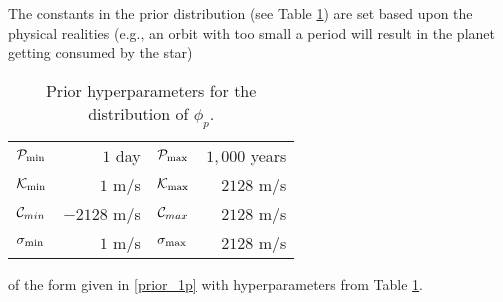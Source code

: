 The constants in the prior distribution (see Table \ref{tab:hyper}) are set based upon the physical realities
(e.g., an orbit with too small a period will result in the planet
getting consumed by the star) \citep{bullard2009edc}
\begin{table}[h]
  \begin{center}
  \begin{tabular}{|lr|lr|} \hline \hline
$\P_{\min}$ &  $1$ day &
$\P_{\max}$ &  $1,000$ years \\
$\K_{\min}$ &  $ 1$ m/s & 
$\K_{\max}$ &  $2128$ m/s \\
$\C_{min}$ &  $-2128$ m/s & 
$\C_{max}$ &   $2128$ m/s \\
$\sj_{\min}$ &  $1$ m/s &
$\sj_{\max}$ &  $2128$ m/s \\ \hline
  \end{tabular}
  \end{center}
\caption{Prior hyperparameters for the distribution of $\phi_p$.}
\label{tab:hyper}
\end{table}
 of the form given in \ref{prior_1p}
with hyperparameters from Table \ref{tab:hyper}.
